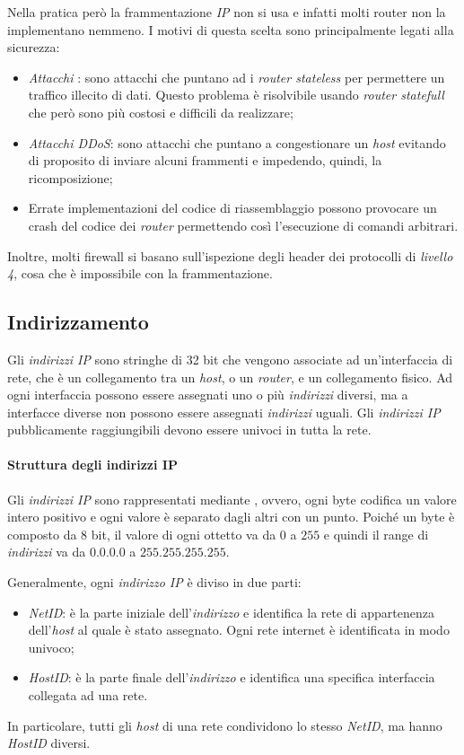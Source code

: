 \bigskip\noindent
Nella pratica però la frammentazione \emph{IP} non si usa e infatti molti
router non la implementano nemmeno. I motivi di questa scelta sono principalmente
legati alla sicurezza:
\begin{itemize}
    \item \emph{Attacchi }: sono attacchi che puntano
    ad  i \emph{router stateless} per permettere un traffico
    illecito di dati. Questo problema è risolvibile usando \emph{router statefull}
    che però sono più costosi e difficili da realizzare;
    \item \emph{Attacchi DDoS}: sono attacchi che puntano a congestionare un
    \emph{host} evitando di proposito di inviare alcuni frammenti e impedendo,
    quindi, la ricomposizione;
    \item Errate implementazioni del codice di riassemblaggio possono provocare
    un crash del codice dei \emph{router} permettendo così l'esecuzione di
    comandi arbitrari.
\end{itemize}
Inoltre, molti firewall si basano sull'ispezione degli header dei
protocolli di \emph{livello 4}, cosa che è impossibile con la frammentazione.

\subsection{Indirizzamento}
Gli \emph{indirizzi IP} sono stringhe di 32 bit che vengono associate ad
un'interfaccia di rete, che è un collegamento tra un \emph{host}, o un
\emph{router}, e un collegamento fisico. Ad ogni interfaccia possono essere
assegnati uno o più \emph{indirizzi} diversi, ma a interfacce diverse non possono
essere assegnati \emph{indirizzi} uguali. Gli \emph{indirizzi IP}
pubblicamente raggiungibili devono essere univoci in tutta la rete.

\paragraph{Struttura degli indirizzi IP}
Gli \emph{indirizzi IP} sono rappresentati mediante ,
ovvero, ogni byte codifica un valore intero positivo e ogni valore è separato
dagli altri con un punto. Poiché un byte è composto da 8 bit, il valore di ogni
ottetto va da $0$ a $255$ e quindi il range di \emph{indirizzi} va da
$0.0.0.0$ a $255.255.255.255$.

Generalmente, ogni \emph{indirizzo IP} è diviso in due parti:
\begin{itemize}
    \item \emph{NetID}: è la parte iniziale dell'\emph{indirizzo} e identifica
    la rete di appartenenza dell'\emph{host} al quale è stato assegnato. Ogni rete
    internet è identificata in modo univoco;
    \item \emph{HostID}: è la parte finale dell'\emph{indirizzo} e identifica
    una specifica interfaccia collegata ad una rete.
\end{itemize}
In particolare, tutti gli \emph{host} di una rete condividono lo stesso
\emph{NetID}, ma hanno \emph{HostID} diversi.

